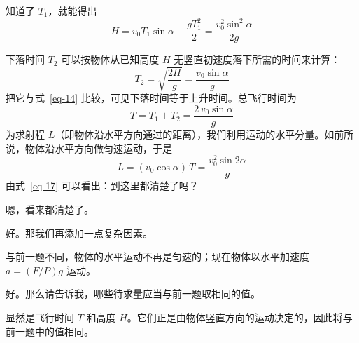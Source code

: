 \begin{dialogue}
知道了 $T_{1}$，就能得出
\begin{equation}%
H = v_{0} T_{1} \sin \alpha - \frac{g T_{1}^{2}}{2} = \frac{v_{0}^{2} \sin^{2} \alpha}{2g}
\label{eq-15}
\end{equation}

下落时间 $T_{2}$ 可以按物体从已知高度 $H$ 无竖直初速度落下所需的时间来计算：
\begin{equation*}%
T_{2} = \sqrt{\frac{2H}{g}} = \frac{v_{0} \sin \alpha}{g}
\end{equation*}
把它与式~\eqref{eq-14} 比较，可见下落时间等于上升时间。总飞行时间为
\begin{equation}%
T= T_{1} + T_{2} = \frac{2 \,v_{0} \sin \alpha}{g}
\label{eq-16}
\end{equation}
为求射程 $L$（即物体沿水平方向通过的距离），我们利用运动的水平分量。如前所说，物体沿水平方向做匀速运动，于是
\begin{equation}%
L= (v_{0} \cos \alpha)\, T = \frac{v_{0}^{2} \sin 2 \alpha}{g}
\label{eq-17}
\end{equation}
由式~\eqref{eq-17} 可以看出：到这里都清楚了吗？

\std 嗯，看来都清楚了。

\tchr 好。那我们再添加一点复杂因素。

\std 与前一题不同，物体的水平运动不再是匀速的；现在物体以水平加速度 $a= \left( F/P \right)g$ 运动。

\tchr {}

\std {}

\tchr 好。那么请告诉我，哪些待求量应当与前一题取相同的值。

\std 显然是飞行时间 $T$ 和高度 $H$。它们正是由物体竖直方向的运动决定的，因此将与前一题中的值相同。


\end{dialogue}
